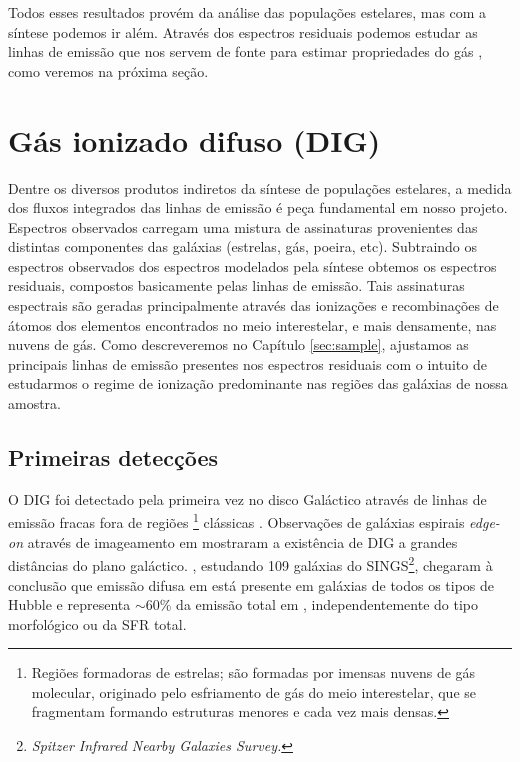 Todos esses resultados provém da análise das populações estelares, mas com a síntese podemos ir além. Através dos espectros residuais podemos estudar as linhas de emissão que nos servem de fonte para estimar propriedades do gás \citep{Asari.etal.2007a}, como veremos na próxima seção.


\section{Gás ionizado difuso (DIG)}
\label{sec:intro:DIG}

Dentre os diversos produtos indiretos da síntese de populações estelares, a medida dos fluxos integrados das linhas de emissão é peça fundamental em nosso projeto. Espectros observados carregam uma mistura de assinaturas provenientes das distintas componentes das galáxias (estrelas, gás, poeira, etc). Subtraindo os espectros observados dos espectros modelados pela síntese obtemos os espectros residuais, compostos basicamente pelas linhas de emissão. Tais assinaturas espectrais são geradas principalmente através das ionizações e recombinações de átomos dos elementos encontrados no meio interestelar, e mais densamente, nas nuvens de gás. Como descreveremos no Capítulo \ref{sec:sample}, ajustamos as principais linhas de emissão presentes nos espectros residuais com o intuito de estudarmos o regime de ionização predominante nas regiões das galáxias de nossa amostra.

\subsection{Primeiras detecções}
\label{sec:intro:DIG:first}
O DIG foi detectado pela primeira vez no disco Galáctico através de linhas de emissão fracas fora de regiões \hii\footnote{Regiões formadoras de estrelas; são formadas por imensas nuvens de gás molecular, originado pelo esfriamento de gás do meio interestelar, que se fragmentam formando estruturas menores e cada vez mais densas.} clássicas \citep{Reynolds.PhD.1971}. Observações de galáxias espirais {\em edge-on} através de imageamento em \Ha \citep{Dettmar.1990, HoopesWaltGreen.1996, HoopesWaltRand.1999} mostraram a existência de DIG a grandes distâncias do plano galáctico. \cite{Oey.etal.2007}, estudando 109 galáxias do SINGS\footnote{\em Spitzer Infrared Nearby Galaxies Survey.}, chegaram à conclusão que emissão difusa em \Ha está presente em galáxias de todos os tipos de Hubble e representa $\sim60\%$ da emissão total em \Ha, independentemente do tipo morfológico ou da SFR total.

